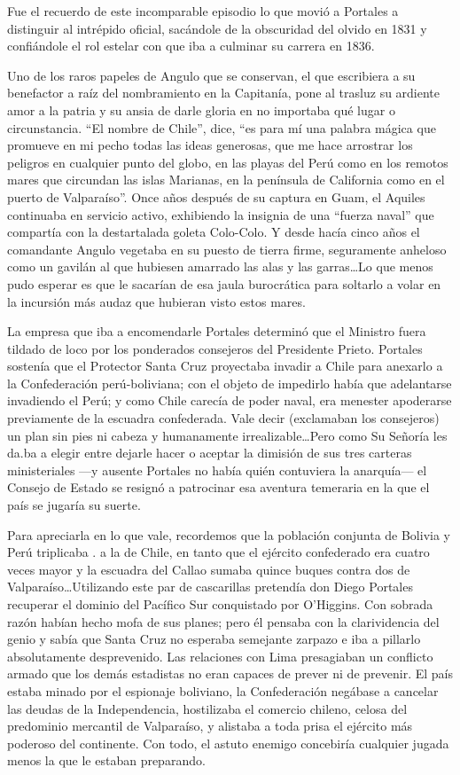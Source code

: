 \documentclass[10pt,twoside,openright]{memoir}
\begin{document}
Fue el recuerdo de este incomparable episodio lo que movió a Portales a
distinguir al intrépido oficial, sacándole de la obscuridad del olvido
en 1831 y confiándole el rol estelar con que iba a culminar su carrera
en 1836.

Uno de los raros papeles de Angulo que se conservan, el que escribiera a
su benefactor a raíz del nombramiento en la Capitanía, pone al trasluz
su ardiente amor a la patria y su ansia de darle gloria en no importaba
qué lugar o circunstancia. ``El nombre de Chile'', dice, ``es para mí una
palabra mágica que promueve en mi pecho todas las ideas generosas, que
me hace arrostrar los peligros en cualquier punto del globo, en las
playas del Perú como en los remotos mares que circundan las islas
Marianas, en la península de California como en el puerto de
Valparaíso''. Once años después de su captura en Guam, el Aquiles
continuaba en servicio activo, exhibiendo la insignia de una ``fuerza
naval'' que compartía con la destartalada goleta Colo-Colo. Y desde hacía
cinco años el comandante Angulo vegetaba en su puesto de tierra firme,
seguramente anheloso como un gavilán al que hubiesen amarrado las alas y
las garras\ldots Lo que menos pudo esperar es que le sacarían de esa jaula
burocrática para soltarlo a volar en la incursión más audaz que hubieran
visto estos mares.

La empresa que iba a encomendarle Portales determinó que el Ministro
fuera tildado de loco por los ponderados consejeros del Presidente
Prieto. Portales sostenía que el Protector Santa Cruz proyectaba invadir
a Chile para anexarlo a la Confederación perú-boliviana; con el objeto
de impedirlo había que adelantarse invadiendo el Perú; y como Chile
carecía de poder naval, era menester apoderarse previamente de la
escuadra confederada. Vale decir (exclamaban los consejeros) un plan sin
pies ni cabeza y humanamente irrealizable\ldots Pero como Su Señoría les
da.ba a elegir entre dejarle hacer o aceptar la dimisión de sus tres
carteras ministeriales ---y ausente Portales no había quién contuviera
la anarquía--- el Consejo de Estado se resignó a patrocinar esa
aventura temeraria en la que el país se jugaría su suerte.

Para apreciarla en lo que vale, recordemos que la población conjunta de
Bolivia y Perú triplicaba . a la de Chile, en tanto que el ejército
confederado era cuatro veces mayor y la escuadra del Callao sumaba
quince buques contra dos de Valparaíso\ldots Utilizando este par de
cascarillas pretendía don Diego Portales recuperar el dominio del
Pacífico Sur conquistado por O'Higgins. Con sobrada razón habían hecho
mofa de sus planes; pero él pensaba con la clarividencia del genio y
sabía que Santa Cruz no esperaba semejante zarpazo e iba a pillarlo
absolutamente desprevenido. Las relaciones con Lima presagiaban un
conflicto armado que los demás estadistas no eran capaces de prever ni
de prevenir. El país estaba minado por el espionaje boliviano, la
Confederación negábase a cancelar las deudas de la Independencia,
hostilizaba el comercio chileno, celosa del predominio mercantil de
Valparaíso, y alistaba a toda prisa el ejército más poderoso del
continente. Con todo, el astuto enemigo concebiría cualquier jugada
menos la que le estaban preparando.
\end{document}
